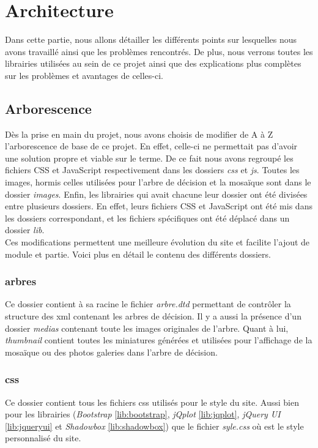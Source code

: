 \documentclass[twoside]{EPURapport}
\begin{document}
\chapter{Architecture}

Dans cette partie, nous allons détailler les différents points sur lesquelles nous avons travaillé ainsi que les problèmes rencontrés. De plus, nous verrons toutes les librairies utilisées au sein de ce projet ainsi que des explications plus complètes sur les problèmes et avantages de celles-ci.

	\section{Arborescence}
	Dès la prise en main du projet, nous avons choisis de modifier de A à Z l'arborescence de base de ce projet. En effet, celle-ci ne permettait pas d'avoir une solution propre et viable sur le terme. De ce fait nous avons regroupé les fichiers CSS et JavaScript respectivement dans les dossiers \emph{css} et \emph{js}. Toutes les images, hormis celles utilisées pour l'arbre de décision et la mosaïque sont dans le dossier \emph{images}. Enfin, les librairies qui avait chacune leur dossier ont été divisées entre plusieurs dossiers. En effet, leurs fichiers CSS et JavaScript ont été mis dans les dossiers correspondant, et les fichiers spécifiques ont été déplacé dans un dossier \emph{lib}.\\

	Ces modifications permettent une meilleure évolution du site et facilite l'ajout de module et partie. Voici plus en détail le contenu des différents dossiers.

		\subsection{arbres}
		Ce dossier contient à sa racine le fichier \emph{arbre.dtd} permettant de contrôler la structure des xml contenant les arbres de décision. Il y a aussi la présence d'un dossier \emph{medias} contenant toute les images originales de l'arbre. Quant à lui, \emph{thumbnail} contient toutes les miniatures générées et utilisées pour l'affichage de la mosaïque ou des photos galeries dans l'arbre de décision.
		
		\subsection{css}
		Ce dossier contient tous les fichiers css utilisés pour le style du site. Aussi bien pour les librairies (\emph{Bootstrap} \ref{lib:bootstrap}, \emph{jQplot} \ref{lib:jqplot}, \emph{jQuery UI} \ref{lib:jqueryui} et \emph{Shadowbox} \ref{lib:shadowbox}) que le fichier \emph{syle.css} où est le style personnalisé du site.
		
\end{document}
